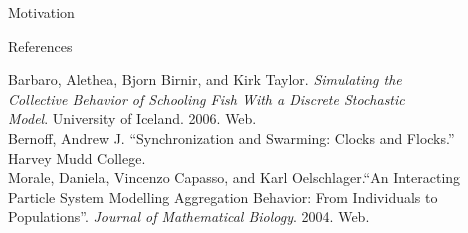 \documentclass[final, xcolor=dvipsnames]{beamer}
\newlength{\onecolwid}
\begin{document}
\begin{frame}[t]
\begin{columns}[t]
\begin{column}{\onecolwid}
\begin{block}{Motivation}
\end{block}


%
%


\begin{block}{References}

\footnotesize{
Barbaro, Alethea, Bjorn Birnir, and Kirk Taylor. \textit{Simulating the}\\
	\hspace{0.5cm}\textit{Collective Behavior of Schooling Fish With a Discrete Stochastic} \\
	\hspace{0.5cm} \textit{Model}. University of Iceland. 2006. Web. \\
	
	\noindent Bernoff, Andrew J. ``Synchronization and Swarming: Clocks and Flocks.'' \\
	\hspace{0.5cm} Harvey Mudd College. \\
	
	\noindent Morale, Daniela, Vincenzo Capasso, and Karl Oelschlager.``An Interacting \\
	\hspace{0.5cm} Particle System Modelling Aggregation Behavior: From Individuals to\\
	\hspace{0.5cm} Populations''. \textit{Journal of Mathematical Biology}. 2004. Web.
	
}
\end{block}
\end{column}
\end{columns}
\end{frame}
\end{document}
